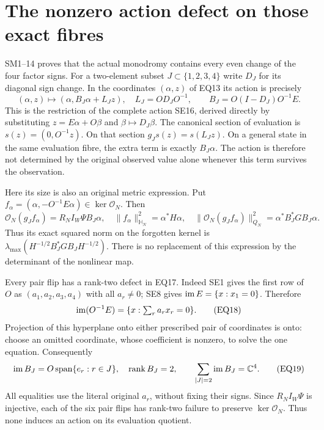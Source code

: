 \documentclass[11pt]{article}
\begin{document}
\section{The nonzero action defect on those exact fibres}
SM1--14 \cite{eightmin:FC} proves that the actual monodromy contains every
even change of the four factor signs. For a two-element subset
$J\subset\{1,2,3,4\}$ write $D_J$ for its diagonal sign change.
In the coordinates $(\alpha,z)$ of EQ13 its action is precisely
\[
 (\alpha,z)\longmapsto(\alpha,B_J\alpha+L_Jz),\quad
 L_J=OD_JO^{-1},\qquad B_J=O(I-D_J)O^{-1}E.                           \tag{EQ16}
\]
This is the restriction of the complete action SE16, derived directly
by substituting $z=E\alpha+O\beta$ and $\beta\mapsto D_J\beta$.
The canonical section of evaluation is $s(z)=(0,O^{-1}z)$.
On that section $g_Js(z)=s(L_Jz)$. On a general state in the
same evaluation fibre, the extra term is exactly $B_J\alpha$.
The action is therefore not determined by the original observed
value alone whenever this term survives the observation.

Here its size is also an original metric expression. Put
$f_\alpha=(\alpha,-O^{-1}E\alpha)\in\ker\mathcal O_N$. Then
\[
 \mathcal O_N(g_J f_\alpha)=R_NI_W\Psi B_J\alpha,\quad
 \|f_\alpha\|_{\mathbb H_N}^2=\alpha^*H\alpha,\quad
 \|\mathcal O_N(g_J f_\alpha)\|_{Q_N}^2
       =\alpha^*B_J^*GB_J\alpha.                                   \tag{EQ17}
\]
Thus its exact squared norm on the forgotten kernel is
$\lambda_{\max}(H^{-1/2}B_J^*GB_JH^{-1/2})$. There is no replacement
of this expression by the determinant of the nonlinear map.

Every pair flip has a rank-two defect in EQ17. Indeed SE1 gives
the first row of $O$ as $(a_1,a_2,a_3,a_4)$ with all $a_r\ne0$;
SE8 gives $\operatorname{im} E=\{x:x_1=0\}$. Therefore
\[
 \operatorname{im}(O^{-1}E)=\{x:\textstyle\sum_r a_rx_r=0\}.                     \tag{EQ18}
\]
Projection of this hyperplane onto either prescribed pair of
coordinates is onto: choose an omitted coordinate, whose coefficient
is nonzero, to solve the one equation. Consequently
\[
 \operatorname{im} B_J=O\operatorname{span}\{e_r:r\in J\},\quad\operatorname{rank} B_J=2,
 \qquad\sum_{|J|=2}\operatorname{im} B_J=\mathbb C^4.                                  \tag{EQ19}
\]
All equalities use the literal original $a_r$, without fixing their
signs. Since $R_NI_W\Psi$ is injective, each of the six pair flips
has rank-two failure to preserve $\ker\mathcal O_N$.
Thus none induces an action on its evaluation quotient.
\end{document}

